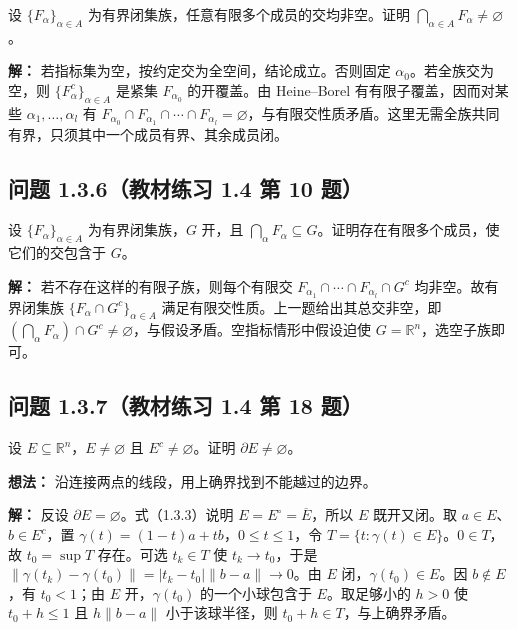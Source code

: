 \documentclass[11pt,a4paper]{article}
\begin{document}
设 \(\{F_\alpha\}_{\alpha\in A}\)
为有界闭集族，任意有限多个成员的交均非空。证明
\(\bigcap_{\alpha\in A}F_\alpha\ne\varnothing\)。

\textbf{解：} 若指标集为空，按约定交为全空间，结论成立。否则固定
\(\alpha_0\)。若全族交为空，则 \(\{F_\alpha^c\}_{\alpha\in A}\) 是紧集
\(F_{\alpha_0}\) 的开覆盖。由 Heine--Borel 有有限子覆盖，因而对某些
\(\alpha_1,\ldots,\alpha_l\) 有
\(F_{\alpha_0}\cap F_{\alpha_1}\cap\cdots\cap F_{\alpha_l}=\varnothing\)，与有限交性质矛盾。这里无需全族共同有界，只须其中一个成员有界、其余成员闭。

\subsection{问题 1.3.6（教材练习 1.4 第 10
题）}\label{ux95eeux9898-1.3.6ux6559ux6750ux7ec3ux4e60-1.4-ux7b2c-10-ux9898}

设 \(\{F_\alpha\}_{\alpha\in A}\) 为有界闭集族，\(G\) 开，且
\(\bigcap_\alpha F_\alpha\subseteq G\)。证明存在有限多个成员，使它们的交包含于
\(G\)。

\textbf{解：} 若不存在这样的有限子族，则每个有限交
\(F_{\alpha_1}\cap\cdots\cap F_{\alpha_l}\cap G^c\) 均非空。故有界闭集族
\(\{F_\alpha\cap G^c\}_{\alpha\in A}\)
满足有限交性质。上一题给出其总交非空，即
\((\bigcap_\alpha F_\alpha)\cap G^c\ne\varnothing\)，与假设矛盾。空指标情形中假设迫使
\(G=\mathbb R^n\)，选空子族即可。

\subsection{问题 1.3.7（教材练习 1.4 第 18
题）}\label{ux95eeux9898-1.3.7ux6559ux6750ux7ec3ux4e60-1.4-ux7b2c-18-ux9898}

设 \(E\subseteq\mathbb R^n\)，\(E\ne\varnothing\) 且
\(E^c\ne\varnothing\)。证明 \(\partial E\ne\varnothing\)。

\textbf{想法：} 沿连接两点的线段，用上确界找到不能越过的边界。

\textbf{解：} 反设 \(\partial E=\varnothing\)。式（1.3.3）说明
\(E=E^\circ=\overline E\)，所以 \(E\) 既开又闭。取
\(a\in E\)、\(b\in E^c\)，置
\(\gamma(t)=(1-t)a+tb\)，\(0\leq t\leq1\)，令
\(T=\{t:\gamma(t)\in E\}\)。\(0\in T\)，故 \(t_0=\sup T\) 存在。可选
\(t_k\in T\) 使 \(t_k\to t_0\)，于是
\(\|\gamma(t_k)-\gamma(t_0)\|=|t_k-t_0|\|b-a\|\to0\)。由 \(E\)
闭，\(\gamma(t_0)\in E\)。因 \(b\notin E\)，有 \(t_0<1\)；由 \(E\)
开，\(\gamma(t_0)\) 的一个小球包含于 \(E\)。取足够小的 \(h>0\) 使
\(t_0+h\leq1\) 且 \(h\|b-a\|\) 小于该球半径，则
\(t_0+h\in T\)，与上确界矛盾。
\end{document}
